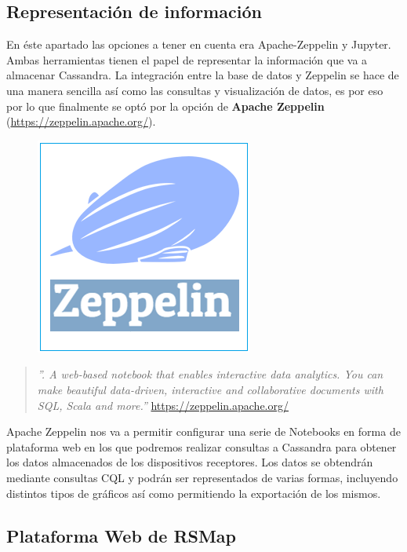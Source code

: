 \subsection{Representación de información}

En éste apartado las opciones a tener en cuenta era Apache-Zeppelin y Jupyter. Ambas herramientas tienen el papel de representar la información que va a almacenar Cassandra. La integración entre la base de datos y Zeppelin se hace de una manera sencilla así como las consultas y visualización de datos, es por eso por lo que finalmente se optó por la opción de \textbf{Apache Zeppelin} (\url{https://zeppelin.apache.org/}).

\begin{figure}[!ht]
  \begin{center}
    \includegraphics[scale=0.60]{../images/zeppelin/logo.png}
    \label{fig:zepplog}
	\end{center}
\end{figure}

\begin{quote}\textit{ ''. A web-based notebook that enables interactive data analytics.
You can make beautiful data-driven, interactive and collaborative documents with SQL, Scala and more.''
}
\newline
\url{https://zeppelin.apache.org/}
\end{quote}

Apache Zeppelin nos va a permitir configurar una serie de Notebooks en forma de plataforma web en los que podremos realizar consultas a Cassandra para obtener los datos almacenados de los dispositivos receptores. Los datos se obtendrán mediante consultas CQL y podrán ser representados de varias formas, incluyendo distintos tipos de gráficos así como permitiendo la exportación de los mismos.

\subsection{Plataforma Web de RSMap}

